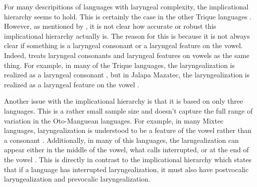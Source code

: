 For many descripitions of languages with laryngeal complexity, the implicational hierarchy seems to hold. This is certainly the case in the other Trique languages \citep{dicanioPhoneticsPhonologySan2008,dicanioItunyosoTrique2010,dicanioCoarticulationToneGlottal2012,dicanioPhoneticsFortisLenis2012,dicanioCueWeightPerception2014,dicanioGlottalTogglingItunyoso2020,elliottChicahuaxtlaTriqui2016,hollenbachPhonologyMorphologyTone1984}. However, as mentioned by \citet{frazierPhoneticsYucatecMaya2013}, it is not clear how accurate or robust this implicational hierarchy actually is. The reason for this is because it is not always clear if something is a laryngeal consonant or a laryngeal feature on the vowel. Indeed, \citet{silvermanLaryngealComplexityOtomanguean1997,silvermanPhasingRecoverability1997} treats laryngeal consonants and laryngeal features on vowels as the same thing. For example, in many of the Trique languages, the laryngealization is realized as a laryngeal consonant \citep{dicanioPhoneticsPhonologySan2008,dicanioItunyosoTrique2010,dicanioCoarticulationToneGlottal2012,dicanioPhoneticsFortisLenis2012,dicanioCueWeightPerception2014,dicanioGlottalTogglingItunyoso2020,elliottChicahuaxtlaTriqui2016,hollenbachPhonologyMorphologyTone1984}, but in Jalapa Mazatec, the laryngealization is realized as a laryngeal feature on the vowel \citep{kirkQuantifyingAcousticProperties1993,garellekAcousticConsequencesPhonation2011}. 

Another issue with the implicational hierarchy is that it is based on only three languages. This is a rather small sample size and doesn't capture the full range of variation in the Oto-Manguean languages. For example, in many Mixtec languages, laryngealization is understood to be a feature of the vowel rather than a consonant \citep[e.g.,][]{cortesSanSebastianMonte2023,eischensTonePhonationPhonologyPhonetics2022,gerfenPhonologyPhoneticsCoatzospan1999,gerfenProductionPerceptionLaryngealized2005}. Additionally, in many of this languages, the larngealization can appear either in the middle of the vowel, what \citet{silvermanLaryngealComplexityOtomanguean1997} calls interrupted, or at the end of the vowel \citep[e.g.,][]{cortesSanSebastianMonte2023,eischensTonePhonationPhonologyPhonetics2022}. This is directly in contrast to the implicational hierarchy which states that if a language has interrupted laryngealization, it must also have postvocalic laryngealization and prevocalic laryngealization.


